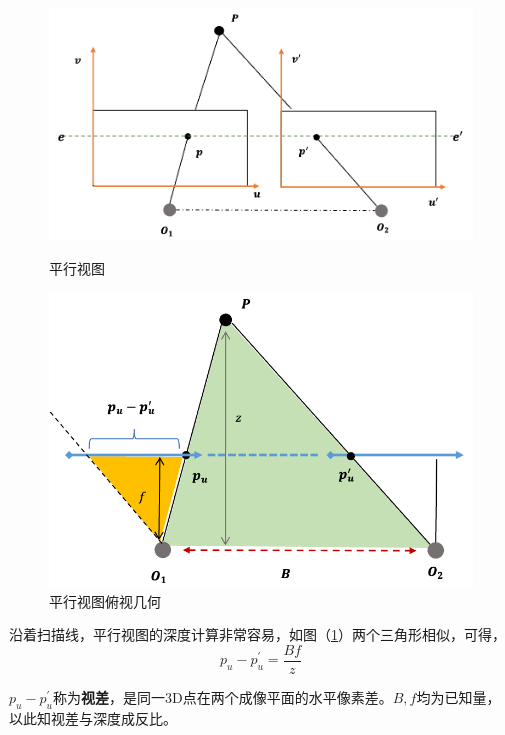 		\begin{figure}[H]
			\begin{minipage}[t]{0.49\linewidth}
				\centering
				\includegraphics[width=\textwidth]{images/two_stereo.png}
				\caption{平行视图}
				\label{two_stereo}
			\end{minipage}
			\begin{minipage}[t]{0.49\linewidth}
				\centering
				\includegraphics[width=\textwidth]{images/two_stereo_depth.png}
				\caption{平行视图俯视几何}
				\label{two_stereo_gemotry}
			\end{minipage}			
		\end{figure}

		沿着扫描线，平行视图的深度计算非常容易，如图（\ref{two_stereo_gemotry}）两个三角形相似，可得，
		$$
			p_u - p^\prime_u = \frac{Bf}{z}
		$$

		$p_u - p^\prime_u$称为\textbf{视差}，是同一3D点在两个成像平面的水平像素差。$B,f$均为已知量，以此知视差与深度成反比。

